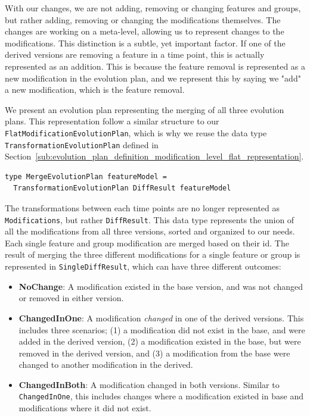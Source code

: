 \documentclass[a4paper,english]{ifimaster}
\begin{document}
With our changes, we are not adding, removing or changing features and groups, but rather adding, removing or changing the modifications themselves. The changes are working on a meta-level, allowing us to represent changes to the modifications. This distinction is a subtle, yet important factor. If one of the derived versions are removing a feature in a time point, this is actually represented as an addition. This is because the feature removal is represented as a new modification in the evolution plan, and we represent this by saying we "add" a new modification, which is the feature removal.

We present an evolution plan representing the merging of all three evolution plans. This representation follow a similar structure to our \texttt{FlatModificationEvolutionPlan}, which is why we reuse the data type \texttt{TransformationEvolutionPlan} defined in Section~\vref{sub:evolution_plan_definition_modification_level_flat_representation}.

\begin{verbatim}
type MergeEvolutionPlan featureModel = 
  TransformationEvolutionPlan DiffResult featureModel
\end{verbatim}

The transformations between each time points are no longer represented as \texttt{Modifications}, but rather \texttt{DiffResult}. This data type represents the union of all the modifications from all three versions, sorted and organized to our needs. Each single feature and group modification are merged based on their id. The result of merging the three different modifications for a single feature or group is represented in \texttt{SingleDiffResult}, which can have three different outcomes:

\begin{itemize}
  \item \textbf{NoChange}: A modification existed in the base version, and was not changed or removed in either version.
  \item \textbf{ChangedInOne}: A modification \textit{changed} in one of the derived versions. This includes three scenarios; (1) a modification did not exist in the base, and were added in the derived version, (2) a modification existed in the base, but were removed in the derived version, and (3) a modification from the base were changed to another modification in the derived.
  \item \textbf{ChangedInBoth}: A modification changed in both versions. Similar to \texttt{ChangedInOne}, this includes changes where a modification existed in base and modifications where it did not exist.
\end{itemize}
\end{document}
